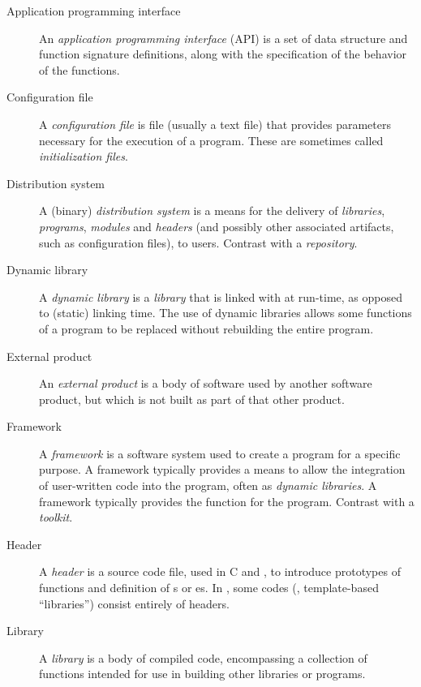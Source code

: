 \documentclass[draftmode,draftwater]{memarticle}
\begin{document}
\begin{description}

\item[Application programming interface] An \emph{application
    programming interface} (API) is a set of data structure and function
  signature definitions, along with the specification of the behavior of
  the functions.

\item[Configuration file] A \emph{configuration file} is file (usually a
  text file) that provides parameters necessary for the execution of a
  program. These are sometimes called \emph{initialization files}.

\item[Distribution system] A (binary) \emph{distribution system} is a
  means for the delivery of \emph{libraries}, \emph{programs},
  \emph{modules} and \emph{headers} (and possibly other associated
  artifacts, such as configuration files), to users. Contrast with a
  \emph{repository}.

\item[Dynamic library] A \emph{dynamic library} is a \emph{library} that
  is linked with at run-time, as opposed to (static) linking time. The
  use of dynamic libraries allows some functions of a program to be
  replaced without rebuilding the entire program.

\item[External product] An \emph{external product} is a body of software
  used by another software product, but which is not built as part of
  that other product.

\item[Framework] A \emph{framework} is a software system used to create
  a program for a specific purpose. A framework typically provides a
  means to allow the integration of user-written code into the program,
  often as \emph{dynamic libraries}. A framework typically provides the
   function for the program. Contrast with a \emph{toolkit}.

\item[Header] A \emph{header} is a source code file, used in C and \cpp,
  to introduce prototypes of functions and definition of s
  or es. In \cpp, some codes (\eg, template-based
  ``libraries'') consist entirely of headers.

\item[Library] A \emph{library} is a body of compiled code, encompassing
  a collection of functions intended for use in building other libraries
  or programs.


\end{description}
\end{document}
